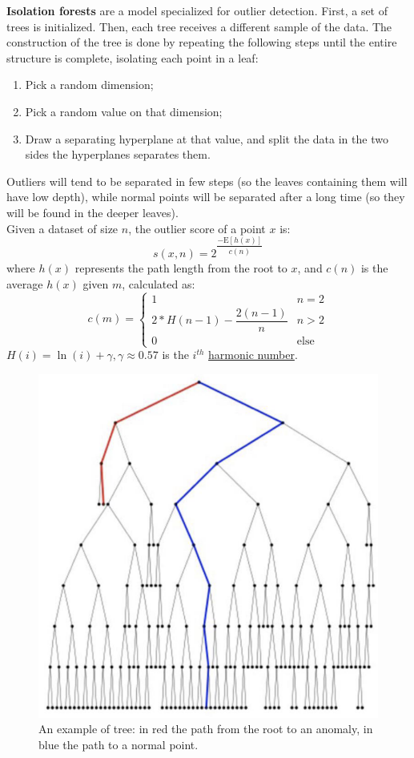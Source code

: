 \textbf{Isolation forests} are a model specialized for outlier detection. First, a set of trees is initialized. Then, each tree receives a different sample of the data. The construction of the tree is done by repeating the following steps until the entire structure is complete, isolating each point in a leaf:
\begin{enumerate}
    \item Pick a random dimension;
    \item Pick a random value on that dimension;
    \item Draw a separating hyperplane at that value, and split the data in the two sides the hyperplanes separates them.
\end{enumerate}
Outliers will tend to be separated in few steps (so the leaves containing them will have low depth), while normal points will be separated after a long time (so they will be found in the deeper leaves). \\
Given a dataset of size $n$, the outlier score of a point $x$ is:
\begin{equation*}
    s(x,n) = 2^{\dfrac{-\mathrm{E}[h(x)]}{c(n)}}
\end{equation*}
where $h(x)$ represents the path length from the root to $x$, and $c(n)$ is the average $h(x)$ given $m$, calculated as:
\begin{equation*}
    c(m) = \begin{cases}
        1 & n = 2 \\
        2 * H(n-1) - \dfrac{2(n-1)}{n} & n > 2 \\
        0 & \text{else}
    \end{cases}
\end{equation*}
$H(i) = \ln(i) + \gamma, \gamma \approx 0.57$ is the $i^{th}$ \hyperlink{https://en.wikipedia.org/wiki/Harmonic_number}{harmonic number}.
\begin{figure}[h]
    \centering
    \includegraphics[width=0.35\linewidth]{img/isolation_tree.png}
    \caption{An example of tree: in red the path from the root to an anomaly, in blue the path to a normal point.}
    \label{fig:isolation-tree}
\end{figure}

